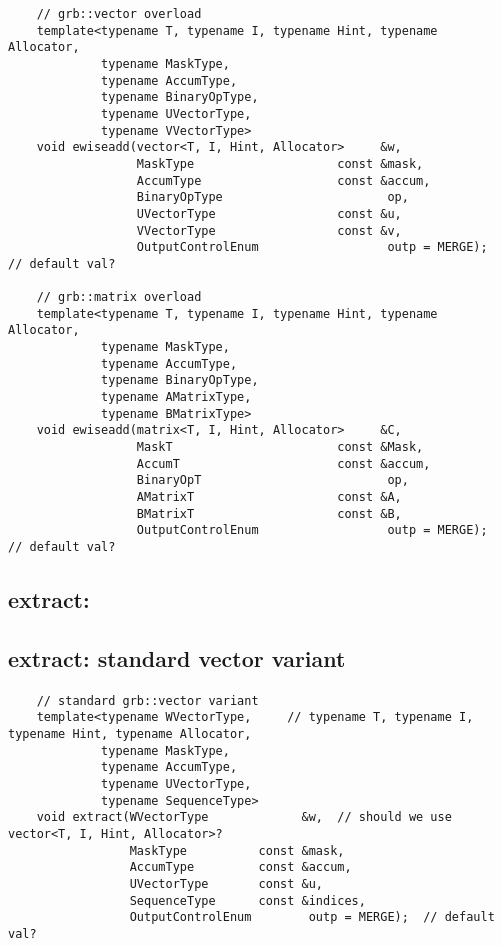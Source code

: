 \begin{verbatim}
    // grb::vector overload
    template<typename T, typename I, typename Hint, typename Allocator,
             typename MaskType,
             typename AccumType,
             typename BinaryOpType,
             typename UVectorType,
             typename VVectorType>
    void ewiseadd(vector<T, I, Hint, Allocator>     &w,
                  MaskType                    const &mask,
                  AccumType                   const &accum,
                  BinaryOpType                       op,
                  UVectorType                 const &u,
                  VVectorType                 const &v,
                  OutputControlEnum                  outp = MERGE);  // default val?

    // grb::matrix overload
    template<typename T, typename I, typename Hint, typename Allocator,
             typename MaskType,
             typename AccumType,
             typename BinaryOpType,
             typename AMatrixType,
             typename BMatrixType>
    void ewiseadd(matrix<T, I, Hint, Allocator>     &C,
                  MaskT                       const &Mask,
                  AccumT                      const &accum,
                  BinaryOpT                          op,
                  AMatrixT                    const &A,
                  BMatrixT                    const &B,
                  OutputControlEnum                  outp = MERGE);  // default val?
\end{verbatim}


\subsection{{\sf extract}: }

\subsection{{\sf extract}: standard vector variant}

\paragraph{\syntax}

\begin{verbatim}
    // standard grb::vector variant
    template<typename WVectorType,     // typename T, typename I, typename Hint, typename Allocator,
             typename MaskType,
             typename AccumType,
             typename UVectorType,
             typename SequenceType>
    void extract(WVectorType             &w,  // should we use vector<T, I, Hint, Allocator>?
                 MaskType          const &mask,
                 AccumType         const &accum,
                 UVectorType       const &u,
                 SequenceType      const &indices,
                 OutputControlEnum        outp = MERGE);  // default val?
\end{verbatim}

